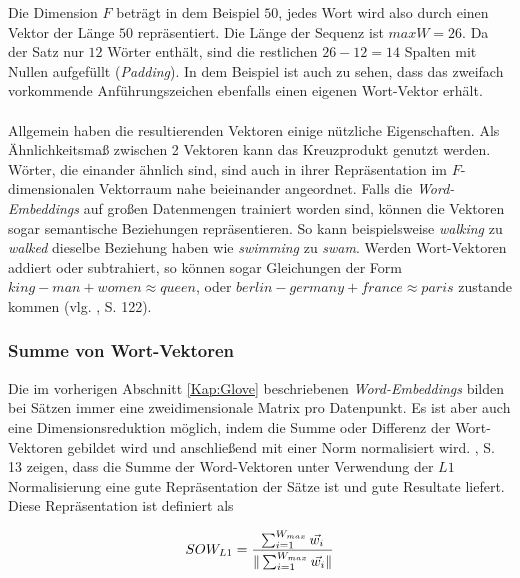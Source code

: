 \documentclass[a4paper,11pt]{article}
\begin{document}
Die Dimension $F$ beträgt in dem Beispiel $50$, jedes Wort wird also durch einen Vektor der Länge $50$ repräsentiert. Die Länge der Sequenz ist $maxW = 26$. Da der Satz nur $12$ Wörter enthält, sind die restlichen $26-12 = 14$ Spalten mit Nullen aufgefüllt (\textit{Padding}). In dem Beispiel ist auch zu sehen, dass das zweifach vorkommende Anführungszeichen  ebenfalls einen eigenen Wort-Vektor erhält.\\
\\
Allgemein haben die resultierenden Vektoren einige nützliche Eigenschaften. Als Ähnlichkeits\-maß zwischen 2 Vektoren kann das Kreuzprodukt genutzt werden. Wörter, die einander ähnlich sind, sind auch in ihrer Repräsentation im $F$-dimensionalen Vektorraum nahe beieinander angeordnet. Falls die \textit{Word-Embeddings} auf großen Datenmengen trainiert worden sind, können die Vektoren sogar semantische Beziehungen repräsentieren. So kann beispielsweise \textit{walking} zu \textit{walked} dieselbe Beziehung haben wie \textit{swimming} zu \textit{swam}. Werden Wort-Vektoren addiert oder subtrahiert, so können sogar Gleichungen der Form $king - man + women \approx queen$, oder $berlin - germany + france \approx paris$ zustande kommen (vlg. \cite{deepEssentials}, S. 122).

\subsubsection{Summe von Wort-Vektoren}

Die im vorherigen Abschnitt \ref{Kap:Glove} beschriebenen \textit{Word-Embeddings} bilden bei Sätzen immer eine zweidimensionale Matrix pro Datenpunkt. Es ist aber auch eine Dimensionsreduktion möglich, indem die Summe oder Differenz der Wort-Vektoren gebildet wird und anschließend mit einer Norm normalisiert wird. \cite{sumsWords}, S. 13 zeigen,
dass die Summe der Word-Vektoren unter Verwendung der $L1$ Normalisierung eine gute Repräsentation der Sätze ist und gute Resultate liefert. Diese Repräsentation ist definiert als

\[SOW_{L1} = \frac{\sum_{i=1}^{W_{max}} \Vec{w_i}}{\| \sum_{i=1}^{W_{max}}  \vec{w_i} \|} \vspace{0.2cm}\]
\end{document}
